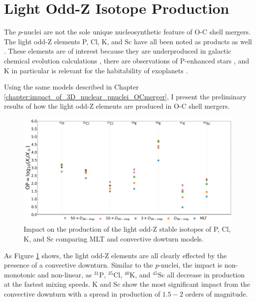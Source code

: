 \section{Light Odd-Z Isotope Production}\label{sec:lightoddZ}

The $p$-nuclei are not the sole unique nucleosynthetic feature of O-C shell mergers.
The light odd-Z elements P, Cl, K, and Sc have all been noted as products as well  \cite{ritterConvectivereactiveNucleosynthesisSc2018, robertiOccurrenceImpactCarbonOxygen2025}.
These elements are of interest because they are underproduced in galactic chemical evolution calculations \citep{ritterConvectivereactiveNucleosynthesisSc2018}, there are observations of P-enhanced stars \citep{masseronPhosphorusrichStarsUnusual2020, braunerUnveilingChemicalFingerprint2023, braunerUnveilingChemicalFingerprint2024}, and $\mathrm{K}$ in particular is relevant for the habitability of exoplanets \cite{frankRadiogenicHeatingEvolution2014, oneillEffectGalacticChemical2020}.

Using the same models described in Chapter \ref{chapter:impact_of_3D_nuclear_pnuclei_OCmerger}, I present the preliminary results of how the light odd-Z elements are produced in O-C shell mergers.

\begin{figure}[htbp]
    \centering
    \includegraphics[width=\textwidth]{chapters/3/figures/lightoddz_downturn.png}
    \caption{Impact on the production of the light odd-Z stable isotopes of P, Cl, K, and Sc comparing MLT and convective dowturn models.}
    \label{fig:lightoddZ_production}
\end{figure}

As Figure \ref{fig:lightoddZ_production} shows, the light odd-Z elements are all clearly effected by the presence of a convective downturn. 
Similar to the $p$-nuclei, the impact is non-monotonic and non-linear, as $^{31}\mathrm{P}$, $^{35}\mathrm{Cl}$, $^{40}\mathrm{K}$, and $^{45}\mathrm{Sc}$ all decrease in production at the fastest mixing speeds.
K and Sc show the most significant impact from the convective downturn with a spread in production of $1.5-2$ orders of magnitude.

